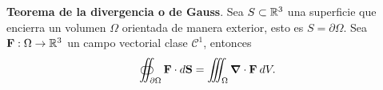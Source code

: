 \begin{theorem}
\textbf{Teorema de la divergencia o de Gauss}. Sea $S\subset\mathbb{R}^3$ una superficie que encierra un volumen $\Omega$ orientada de manera exterior, esto es $S=\partial \Omega$. Sea $\mathbf{F}:\Omega\to\mathbb{R}^3$ un campo vectorial clase $\mathcal{C}^1$, entonces
\[
    \oiint_{\partial \Omega}\mathbf{F}\cdot d\mathbf{S}=\iiint_{\Omega}\grad\cdot\mathbf{F}\:dV.
\]
\end{theorem}